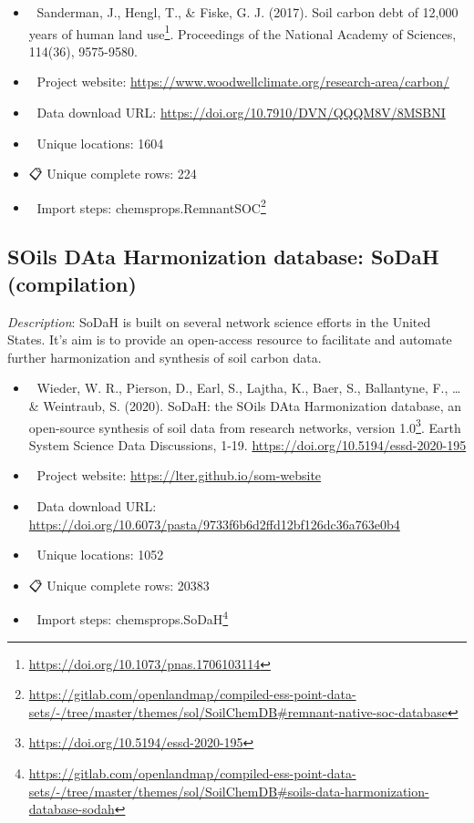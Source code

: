 \documentclass[
  graybox,natbib,nospthms]{svmono}
\providecommand{\tightlist}{%
  \setlength{\itemsep}{0pt}\setlength{\parskip}{0pt}}
\providecommand{\tightlist}{\setlength{\itemsep}{0pt}\setlength{\parskip}{0pt}}
\renewcommand{\href}[2]{#2 (\url{#1})}
\renewcommand{\href}[2]{#2\footnote{\url{#1}}}
\begin{document}
\begin{itemize}
\tightlist
\item
  📕 Sanderman, J., Hengl, T., \& Fiske, G. J. (2017). \href{https://doi.org/10.1073/pnas.1706103114}{Soil carbon debt of 12,000 years of human land use}. Proceedings of the National Academy of Sciences, 114(36), 9575-9580.\\
\item
  🔗 Project website: \url{https://www.woodwellclimate.org/research-area/carbon/}\\
\item
  📂 Data download URL: \url{https://doi.org/10.7910/DVN/QQQM8V/8MSBNI}\\
\item
  📍 Unique locations: 1604\\
\item
  📋 Unique complete rows: 224\\
\item
  📝 Import steps: \href{https://gitlab.com/openlandmap/compiled-ess-point-data-sets/-/tree/master/themes/sol/SoilChemDB\#remnant-native-soc-database}{chemsprops.RemnantSOC}
\end{itemize}

\hypertarget{soils-data-harmonization-database-sodah-compilation}{%
\subsection{SOils DAta Harmonization database: SoDaH (compilation)}\label{soils-data-harmonization-database-sodah-compilation}}

\emph{Description}: SoDaH is built on several network science efforts in the
United States. It's aim is to provide an open-access resource to facilitate and automate further harmonization and synthesis of soil carbon data.

\begin{itemize}
\tightlist
\item
  📕 Wieder, W. R., Pierson, D., Earl, S., Lajtha, K., Baer, S., Ballantyne, F., \ldots{} \& Weintraub, S. (2020). \href{https://doi.org/10.5194/essd-2020-195}{SoDaH: the SOils DAta Harmonization database, an open-source synthesis of soil data from research networks, version 1.0}. Earth System Science Data Discussions, 1-19. \url{https://doi.org/10.5194/essd-2020-195}\\
\item
  🔗 Project website: \url{https://lter.github.io/som-website}\\
\item
  📂 Data download URL: \url{https://doi.org/10.6073/pasta/9733f6b6d2ffd12bf126dc36a763e0b4}\\
\item
  📍 Unique locations: 1052\\
\item
  📋 Unique complete rows: 20383\\
\item
  📝 Import steps: \href{https://gitlab.com/openlandmap/compiled-ess-point-data-sets/-/tree/master/themes/sol/SoilChemDB\#soils-data-harmonization-database-sodah}{chemsprops.SoDaH}
\end{itemize}
\end{document}

